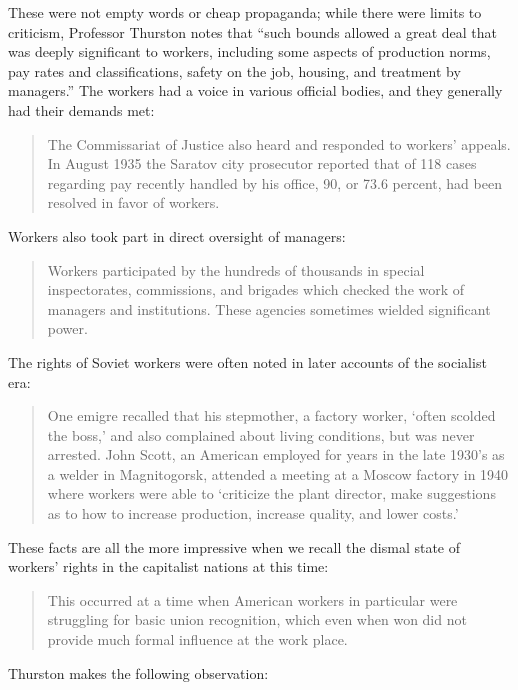 These were not empty words or cheap propaganda; while there were limits
to criticism, Professor Thurston notes that ``such bounds allowed a
great deal that was deeply significant to workers, including some
aspects of production norms, pay rates and classifications, safety on
the job, housing, and treatment by managers.'' The workers had a voice
in various official bodies, and they generally had their demands met:

\begin{quote}
The Commissariat of Justice also heard and responded to workers'
appeals. In August 1935 the Saratov city prosecutor reported that of 118
cases regarding pay recently handled by his office, 90, or 73.6 percent,
had been resolved in favor of workers.
\end{quote}

Workers also took part in direct oversight of managers:

\begin{quote}
Workers participated by the hundreds of thousands in special
inspectorates, commissions, and brigades which checked the work of
managers and institutions. These agencies sometimes wielded significant
power.
\end{quote}

The rights of Soviet workers were often noted in later accounts of the
socialist era:

\begin{quote}
One emigre recalled that his stepmother, a factory worker, `often
scolded the boss,' and also complained about living conditions, but was
never arrested. John Scott, an American employed for years in the late
1930's as a welder in Magnitogorsk, attended a meeting at a Moscow
factory in 1940 where workers were able to `criticize the plant
director, make suggestions as to how to increase production, increase
quality, and lower costs.'
\end{quote}

These facts are all the more impressive when we recall the dismal state
of workers' rights in the capitalist nations at this time:

\begin{quote}
This occurred at a time when American workers in particular were
struggling for basic union recognition, which even when won did not
provide much formal influence at the work place.
\end{quote}

Thurston makes the following observation:

